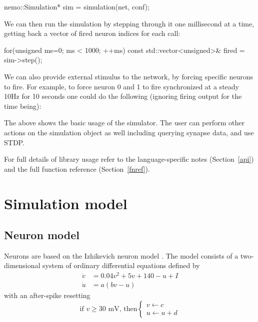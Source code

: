 \documentclass[a4paper]{article}
\begin{document}
\begin{ccode}
nemo::Simulation* sim = simulation(net, conf); 
\end{ccode}

We can then run the simulation by stepping through it one millisecond at a time,
getting back a vector of fired neuron indices for each call:

\begin{ccode}
for(unsigned ms=0; ms < 1000; ++ms) {
	const std::vector<unsigned>& fired = sim->step();
}
\end{ccode}

We can also provide external stimulus to the network, by forcing specific neurons to fire.
For example, to force neuron 0 and 1 to fire synchronized at a steady 10Hz for 10 seconds
	one could do the following (ignoring firing output for the time being):


The above shows the basic usage of the simulator.
The user can perform other actions on the simulation object as well
	including querying synapse data,
	and use STDP.

For full details of library usage refer to the
	language-specific notes (Section~\ref{api})
	and the full function reference (Section~\ref{fnref}).

\section{Simulation model}
\label{model}

\subsection{Neuron model}
\label{model:neuron}

Neurons are based on the Izhikevich neuron model \cite{izhikevich2003simple_model}.
The model consists of a two-dimensional system of ordinary differential equations defined by
\begin{align}
	\dot{v} & = 0.04v^2+5v+140-u+I    \label{eq:update_v} \\
	\dot{u} & = a(bv-u)               \label{eq:update_u}
\end{align}
with an after-spike resetting
\begin{equation}
\label{eq:reset}
\text{if }v\ge30\text{ mV, then}\begin{cases}v\leftarrow c\\u\leftarrow u+d\end{cases}
\end{equation}
\end{document}

